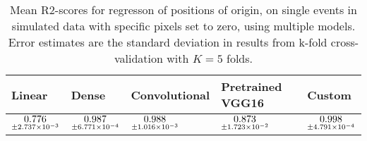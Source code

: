 \begin{table}
\centering
\caption{
Mean R2-scores for regresson of positions of origin, on single events in simulated data with specific pixels
set to zero, using multiple models. 
Error estimates are the standard deviation in results from k-fold cross-validation 
with $K=5$ folds.
}
\label{tab:regression-simulated-single-position-pixelmod-r2}
\begin{tabular}{lllll}
\toprule
                                             Linear &                                               Dense &                                       Convolutional &                                    Pretrained VGG16 &                                              Custom \\
\midrule
 $\underset{\num{+- 2.737e-03 }  }{\num{ 0.776 } }$ &  $\underset{\num{+- 6.771e-04 }  }{\num{ 0.987 } }$ &  $\underset{\num{+- 1.016e-03 }  }{\num{ 0.988 } }$ &  $\underset{\num{+- 1.723e-02 }  }{\num{ 0.873 } }$ &  $\underset{\num{+- 4.791e-04 }  }{\num{ 0.998 } }$ \\
\bottomrule
\end{tabular}
\end{table}
